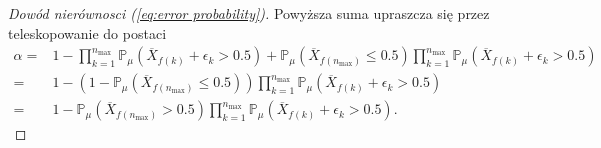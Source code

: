 \documentclass[inzynierska]{pwr_wmat_praca_dyplomowa}
\theoremstyle{plain}
\numberwithin{theorem}{chapter}
\theoremstyle{definition}
\numberwithin{theorem}{chapter}
\newcommand{\probP}{\mathbb{P}}
\newcommand{\nmax}{n_{\text{max}}}
\begin{document}
\begin{proof}[Dowód nierównosci (\ref{eq:error probability})]
	Powyższa suma upraszcza się przez teleskopowanie do postaci
	\begin{align*}
		\alpha =&  1- \prod^{\nmax}_{k=1} \probP_{\mu}(\overline{X}_{f(k)} +  \epsilon_{k} > 0.5)+ 
		\probP_{\mu}(\overline{X}_{f(\nmax)} \le 0.5)\prod^{\nmax}_{k=1} \probP_{\mu}(\overline{X}_{f(k)} +  \epsilon_{k} > 0.5)\\
		=& 1 - (1 - \probP_{\mu}(\overline{X}_{f(\nmax)} \le 0.5))
		\prod^{\nmax}_{k=1} \probP_{\mu}(\overline{X}_{f(k)} +  \epsilon_{k} > 0.5) \\
		=&1 -  \probP_{\mu}(\overline{X}_{f(\nmax)} > 0.5)
		\prod^{\nmax}_{k=1} \probP_{\mu}(\overline{X}_{f(k)} +  \epsilon_{k} > 0.5).
	\end{align*}
\end{proof}

\newpage



\end{document}
